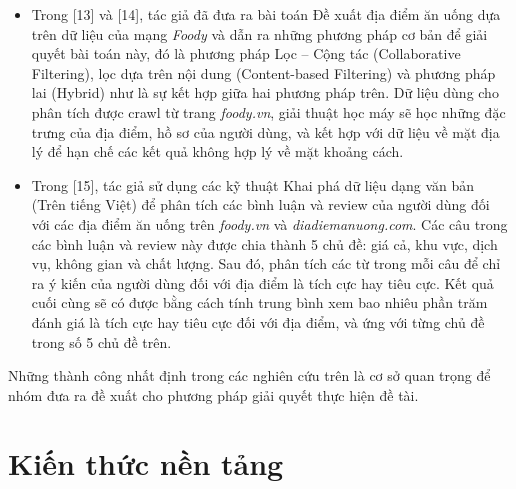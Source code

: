 \documentclass[12pt]{extarticle}
\begin{document}
			\begin{itemize}
				\item Trong [13] và [14], tác giả đã đưa ra bài toán Đề xuất địa điểm ăn uống dựa trên dữ liệu của mạng \textit{Foody}  và dẫn ra những phương pháp cơ bản để giải quyết bài toán này, đó là phương pháp Lọc – Cộng tác (Collaborative Filtering), lọc dựa trên nội dung (Content-based Filtering) và phương pháp lai (Hybrid) như là sự kết hợp giữa hai phương pháp trên. Dữ liệu dùng cho phân tích được crawl từ trang \textit{foody.vn}, giải thuật học máy sẽ học những đặc trưng của địa điểm, hồ sơ của người dùng, và kết hợp với dữ liệu về mặt địa lý để hạn chế các kết quả không hợp lý về mặt khoảng cách. 
				\item Trong [15], tác giả sử dụng các kỹ thuật Khai phá dữ liệu dạng văn bản (Trên tiếng Việt) để phân tích các bình luận và review của người dùng đối với các địa điểm ăn uống trên \textit{foody.vn} và \textit{diadiemanuong.com}. Các câu trong các bình luận và review này được chia thành 5 chủ đề: giá cả, khu vực, dịch vụ, không gian và chất lượng. Sau đó, phân tích các từ trong mỗi câu để chỉ ra ý kiến của người dùng đối với địa điểm là tích cực hay tiêu cực. Kết quả cuối cùng sẽ có được bằng cách tính trung bình xem bao nhiêu phần trăm đánh giá là tích cực hay tiêu cực đối với địa điểm, và ứng với từng chủ đề trong số 5 chủ đề trên.   
				\end{itemize}
			\par Những thành công nhất định trong các nghiên cứu trên là cơ sở quan trọng để nhóm đưa ra đề xuất cho phương pháp giải quyết thực hiện đề tài.


\section{Kiến thức nền tảng}
\end{document}
